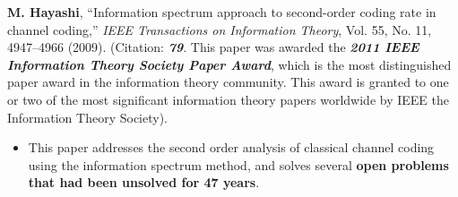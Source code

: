 

\renewcommand{\refname}{}
\vspace{-20 mm}
\begin{thebibliography}{99}







 \textbf{M. Hayashi}, 
``Information spectrum approach to second-order coding rate in channel coding,''
{\em IEEE Transactions on Information Theory},
Vol. 55, No. 11, 4947--4966 (2009). 
(Citation: \textbf{\textit{79}}.  This paper was awarded the
\textbf{\em 2011 IEEE Information Theory Society Paper Award}, which is
the most distinguished paper award in the information theory community.
This award is granted to one or two of the most significant information
theory papers worldwide by IEEE the Information Theory Society).

\begin{itemize}
\item This paper addresses the second order analysis of classical channel coding using the information spectrum method,
and solves several {\bf open problems that had been unsolved for 47 years}.


\end{itemize}
\end{thebibliography}

